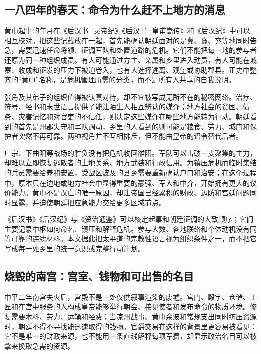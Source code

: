 \subsection{一八四年的春天：命令为什么赶不上地方的消息}

黄巾起事的年月在《后汉书·灵帝纪》《后汉书·皇甫嵩传》和《后汉纪》中可以相互校对。把这些记载放在一起，首先能确认朝廷面对的是冀、豫、兖等地同时告急，需要迅速任命将领、征调军队和处置道路的危机。它们不能把每一地的参与者还原为同一种组织成员。有人可能通过方主、亲属和乡里进入动员，有人可能在城寨、收成和征发的压力下被迫卷入，也有人选择逃离、观望或协助郡县。正史中整齐的“黄巾”名称，是危机管理所需的分类，而不是所有人共享的自我说明。

张角及其弟子的组织值得被认真对待，却不宜被写成无所不在的秘密网络。治疗、符号、经书和末世语言提供了能让陌生人相互辨认的媒介；地方社会的贫困、债务、灾害记忆和对官吏的不信任，则决定这些媒介在哪些地方能转为行动。朝廷看到的首先是州郡失守和军队调动，乡里的人看到的则可能是粮食、劳力、城门和保护者突然不再可靠。两种视角并不互相排斥，但不能由皇帝的诏令替代后者。

广宗、下曲阳等战场的胜负没有把危机收回雒阳。军队可以击破一支聚集的主力，却难以立即恢复逃散者的土地关系、地方武装和行政信用。为镇压危机而临时集结的兵员需要给养和安置，受战区波及的县乡需要重新确认户口和治安；在这个过程中，原本只在边地或地方社会中显得重要的豪强、军人和中介，开始拥有更大的议价能力。黄巾不是汉亡的唯一原因，却让帝国已经累积的财政、边防和宫廷问题同时显露，并迫使朝廷把应急能力交给更多区域节点。

\begin{sourcenote}[黄巾的口号不能替代地方经验]
《后汉书》《后汉纪》与《资治通鉴》可以核定起事和朝廷征调的大致顺序；它们主要记录中枢如何命名、镇压和解释危机。参与人数、各地联络和个体动机没有同等可靠的连续材料。本文据此把太平道的宗教性语言视为组织条件之一，而不把它写成每一处乡里的统一意识或完整行动计划。
\end{sourcenote}

\subsection{烧毁的南宫：宫室、钱物和可出售的名目}

中平二年南宫失火后，宫殿不是一处仅供叙事渲染的废墟。宫门、殿宇、仓储、工匠和在宫中服务的人构成皇帝能够举行朝会、接见使者和发布命令的物质环境。修复需要木料、劳力、运输和经费；当凉州战事、黄巾余波和常规支出同时挤压资源时，朝廷不得不寻找能迅速取得的钱物。官爵交易在这样的背景里更容易被看见：它不是唯一的财政来源，也不能用一条直线解释每项军费，却显示政治名目可以被拿来换取急需的资源。

